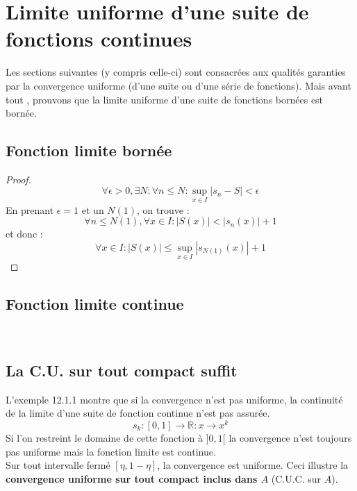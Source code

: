 \documentclass[11pt, a4paper, openany]{book}
\begin{document}
							
							
							
							
							
							
		\section{Limite uniforme d'une suite de fonctions continues}
		Les sections suivantes (y compris celle-ci) sont consacrées aux qualités garanties par la convergence uniforme (d'une suite ou d'une série de fonctions). Mais avant tout , prouvons que la limite uniforme d'une suite de fonctions bornées est bornée.
		\setcounter{subsection}{-1}
		\subsection{Fonction limite bornée}
		\begin{proof}
			\begin{equation}
				\forall \epsilon > 0, \exists N : \forall n \leq N : \sup\limits_{x \in I} |s_n - S| < \epsilon
			\end{equation}
			En prenant $\epsilon = 1$ et un $N(1)$, on trouve :
			\begin{equation}
				\forall n \leq N(1), \forall x \in I : |S(x)| < |s_n(x)|+1
			\end{equation}
			et donc :
			\begin{equation}
				\forall x \in I : |S(x)| \leq \sup\limits_{x \in I} |s_{N(1)}(x)|+1
			\end{equation}
		\end{proof}
							
							
							
		\subsection{Fonction limite continue}
		\ \\
							
		\subsection{La C.U. sur tout compact suffit}
		L'exemple 12.1.1 montre que si la convergence n'est pas uniforme, la continuité de la limite d'une suite de fonction continue n'est pas assurée. 
		\begin{equation}
			s_k : [0,1] \rightarrow \mathbb{R} : x \rightarrow x^k
		\end{equation}
		Si l'on restreint le domaine de cette fonction à $]0,1[$ la convergence n'est toujours pas uniforme mais la fonction limite est continue.\\
		Sur tout intervalle fermé $[\eta, 1-\eta]$, la convergence est uniforme. Ceci illustre la \textbf{convergence uniforme sur tout compact inclus dans $A$} (C.U.C. sur $A$).
							
\end{document}
